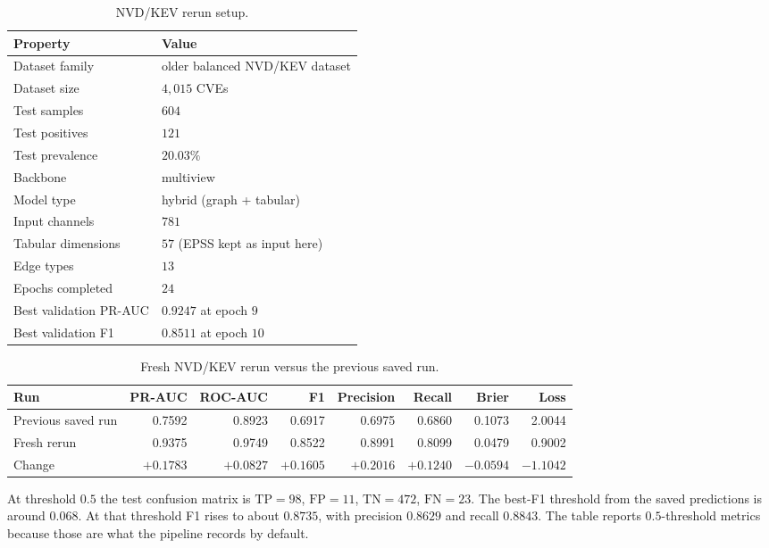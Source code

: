 \documentclass[11pt]{article}
\begin{document}
\begin{table}[h]
\centering
\small
\begin{tabular}{ll}
\toprule
Property & Value \\
\midrule
Dataset family & older balanced NVD/KEV dataset \\
Dataset size & $4{,}015$ CVEs \\
Test samples & $604$ \\
Test positives & $121$ \\
Test prevalence & $20.03\%$ \\
Backbone & multiview \\
Model type & hybrid (graph + tabular) \\
Input channels & $781$ \\
Tabular dimensions & $57$ (EPSS kept as input here) \\
Edge types & $13$ \\
Epochs completed & $24$ \\
Best validation PR-AUC & $0.9247$ at epoch $9$ \\
Best validation F1 & $0.8511$ at epoch $10$ \\
\bottomrule
\end{tabular}
\caption{NVD/KEV rerun setup.}
\end{table}

\begin{table}[h]
\centering
\small
\begin{tabular}{lrrrrrrr}
\toprule
Run & PR-AUC & ROC-AUC & F1 & Precision & Recall & Brier & Loss \\
\midrule
Previous saved run & 0.7592 & 0.8923 & 0.6917 & 0.6975 & 0.6860 & 0.1073 & 2.0044 \\
Fresh rerun         & 0.9375 & 0.9749 & 0.8522 & 0.8991 & 0.8099 & 0.0479 & 0.9002 \\
Change              & $+0.1783$ & $+0.0827$ & $+0.1605$ & $+0.2016$ & $+0.1240$ & $-0.0594$ & $-1.1042$ \\
\bottomrule
\end{tabular}
\caption{Fresh NVD/KEV rerun versus the previous saved run.}
\end{table}

At threshold $0.5$ the test confusion matrix is
$\mathrm{TP} = 98$, $\mathrm{FP} = 11$, $\mathrm{TN} = 472$,
$\mathrm{FN} = 23$. The best-F1 threshold from the saved predictions
is around $0.068$. At that threshold F1 rises to about $0.8735$, with
precision $0.8629$ and recall $0.8843$. The table reports
$0.5$-threshold metrics because those are what the pipeline records
by default.
\end{document}

